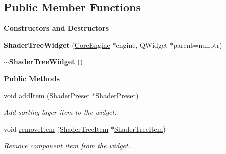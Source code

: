 \subsection*{Public Member Functions}
\begin{Indent}\textbf{ Constructors and Destructors}\par
\begin{DoxyCompactItemize}
\item 
\mbox{\label{classrev_1_1_view_1_1_shader_tree_widget_adb31f0bfd99b02f26df7b9ba4b754d6c}} 
{\bfseries Shader\+Tree\+Widget} (\mbox{\hyperlink{classrev_1_1_core_engine}{Core\+Engine}} $\ast$engine, Q\+Widget $\ast$parent=nullptr)
\item 
\mbox{\label{classrev_1_1_view_1_1_shader_tree_widget_a5657f315e745e21e7c7fb2f28440c804}} 
{\bfseries $\sim$\+Shader\+Tree\+Widget} ()
\end{DoxyCompactItemize}
\end{Indent}
\begin{Indent}\textbf{ Public Methods}\par
\begin{DoxyCompactItemize}
\item 
\mbox{\label{classrev_1_1_view_1_1_shader_tree_widget_a766546e50b898f71c15ba2f1e82de5c8}} 
void \mbox{\hyperlink{classrev_1_1_view_1_1_shader_tree_widget_a766546e50b898f71c15ba2f1e82de5c8}{add\+Item}} (\mbox{\hyperlink{classrev_1_1_shader_preset}{Shader\+Preset}} $\ast$\mbox{\hyperlink{classrev_1_1_shader_preset}{Shader\+Preset}})
\begin{DoxyCompactList}\small\item\em Add sorting layer item to the widget. \end{DoxyCompactList}\item 
\mbox{\label{classrev_1_1_view_1_1_shader_tree_widget_a5214253a6387057561cbe1a8091ff8ac}} 
void \mbox{\hyperlink{classrev_1_1_view_1_1_shader_tree_widget_a5214253a6387057561cbe1a8091ff8ac}{remove\+Item}} (\mbox{\hyperlink{classrev_1_1_view_1_1_shader_tree_item}{Shader\+Tree\+Item}} $\ast$\mbox{\hyperlink{classrev_1_1_view_1_1_shader_tree_item}{Shader\+Tree\+Item}})
\begin{DoxyCompactList}\small\item\em Remove component item from the widget. \end{DoxyCompactList}\end{DoxyCompactItemize}
\end{Indent}
